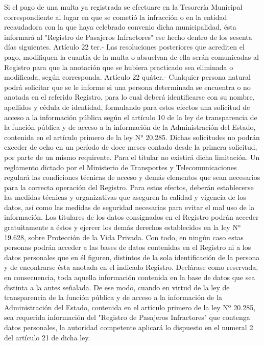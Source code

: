     Si el pago de una multa ya registrada se efectuare en la Tesorería Municipal correspondiente al lugar en que se cometió la infracción o en la entidad recaudadora con la que haya celebrado convenio dicha municipalidad, ésta informará al "Registro de Pasajeros Infractores" ese hecho dentro de los sesenta días siguientes.
    Artículo 22 ter.- Las resoluciones posteriores que acrediten el pago, modifiquen la cuantía de la multa o absuelvan de ella serán comunicadas al Registro para que la anotación que se hubiera practicado sea eliminada o modificada, según corresponda.
    Artículo 22 quáter.- Cualquier persona natural podrá solicitar que se le informe si una persona determinada se encuentra o no anotada en el referido Registro, para lo cual deberá identificarse con su nombre, apellidos y cédula de identidad, formulando para estos efectos una solicitud de acceso a la información pública según el artículo 10 de la ley de transparencia de la función pública y de acceso a la información de la Administración del Estado, contenida en el artículo primero de la ley N° 20.285. Dichas solicitudes no podrán exceder de ocho en un período de doce meses contado desde la primera solicitud, por parte de un mismo requirente. Para el titular no existirá dicha limitación. Un reglamento dictado por el Ministerio de Transportes y Telecomunicaciones regulará las condiciones técnicas de acceso y demás elementos que sean necesarios para la correcta operación del Registro. Para estos efectos, deberán establecerse las medidas técnicas y organizativas que aseguren la calidad y vigencia de los datos, así como las medidas de seguridad necesarias para evitar el mal uso de la información.
    Los titulares de los datos consignados en el Registro podrán acceder gratuitamente a éstos y ejercer los demás derechos establecidos en la ley N° 19.628, sobre Protección de la Vida Privada.
    Con todo, en ningún caso estas personas podrán acceder a las bases de datos contenidas en el Registro ni a los datos personales que en él figuren, distintos de la sola identificación de la persona y de encontrarse ésta anotada en el indicado Registro. Declárase como reservada, en consecuencia, toda aquella información contenida en la base de datos que sea distinta a la antes señalada. De ese modo, cuando en virtud de la ley de transparencia de la función pública y de acceso a la información de la Administración del Estado, contenida en el artículo primero de la ley Nº 20.285, sea requerida información del "Registro de Pasajeros Infractores" que contenga datos personales, la autoridad competente aplicará lo dispuesto en el numeral 2 del artículo 21 de dicha ley.
